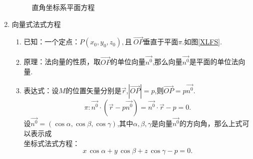 \begin{enumerate}[\large1.]
\begin{figure}[h]
{\begin{minipage}[b]{0.5\linewidth}
				\label{DFS}
			\end{minipage}%
		}%
		\caption{直角坐标系平面方程}
	\end{figure}
	\label{平面的向量式法式方程}
	\item  {\color{dy}\large 向量式法式方程}
	\begin{enumerate}[]
		\item 已知：{\color{dl}一个定点}：$P(x_0,y_0,z_0),$且{\color{dl}$\ \overrightarrow{OP}$垂直于平面$\pi $}.如图\ref{XLFS}.
		\item 原理：法向量的性质，取$\overrightarrow{OP}$的单位向量$\overrightarrow{n^0}$,那么向量$\overrightarrow{n^0}$是平面的单位法向量. 
		\item 表达式：设$M$的位置矢量分别是$\overrightarrow{r}$,$\left|\overrightarrow{OP} \right| =p$,则$\overrightarrow{OP} =p\overrightarrow{n^0}.$
		\begin{equation}
		\pi :\overrightarrow{n^0}\cdot \left(\overrightarrow{r}-p\overrightarrow{n^0} \right) =\overrightarrow{n^0}\cdot \overrightarrow{r}-p=0.
		\end{equation}
		\qquad 设$\overrightarrow{n^0}=\left(\cos \alpha ,\cos \beta ,\cos \gamma \right) $,其中$\alpha , \beta , \gamma$是向量$\overrightarrow{n^0}$的方向角，那么上式可以表示成\\
		{\color{dy}坐标式法式方程}：
		\begin{equation}
		x\,\cos \alpha +y\,\cos \beta +z\,\cos \gamma-p=0.

\end{equation}
\end{enumerate}
\end{enumerate}

